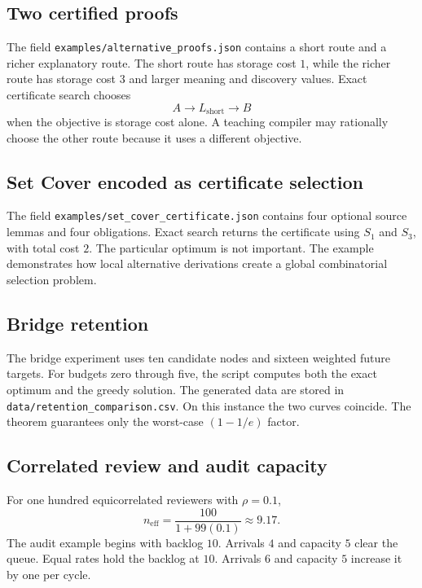 \documentclass[11pt,oneside]{article}
\theoremstyle{definition}
\theoremstyle{remark}
\begin{document}
\subsection{Two certified proofs}

The field \texttt{examples/alternative\_proofs.json} contains a short route and a richer explanatory route. The short route has storage cost $1$, while the richer route has storage cost $3$ and larger meaning and discovery values. Exact certificate search chooses
\[
A\longrightarrow L_{\mathrm{short}}\longrightarrow B
\]
when the objective is storage cost alone. A teaching compiler may rationally choose the other route because it uses a different objective.

\subsection{Set Cover encoded as certificate selection}

The field \texttt{examples/set\_cover\_certificate.json} contains four optional source lemmas and four obligations. Exact search returns the certificate using $S_1$ and $S_3$, with total cost $2$. The particular optimum is not important. The example demonstrates how local alternative derivations create a global combinatorial selection problem.

\subsection{Bridge retention}

The bridge experiment uses ten candidate nodes and sixteen weighted future targets. For budgets zero through five, the script computes both the exact optimum and the greedy solution. The generated data are stored in \texttt{data/retention\_comparison.csv}. On this instance the two curves coincide. The theorem guarantees only the worst-case $(1-1/e)$ factor.

\subsection{Correlated review and audit capacity}

For one hundred equicorrelated reviewers with $\rho=0.1$,
\[
n_{\mathrm{eff}}
=
\frac{100}{1+99(0.1)}
\approx 9.17.
\]
The audit example begins with backlog $10$. Arrivals $4$ and capacity $5$ clear the queue. Equal rates hold the backlog at $10$. Arrivals $6$ and capacity $5$ increase it by one per cycle.
\end{document}
